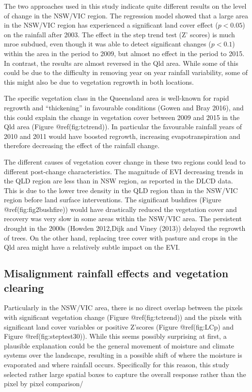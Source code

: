 \documentclass[fleqn,10pt,lineno]{wlpeerj} %
\begin{document}
The two approaches used in this study indicate quite different results
on the level of change in the NSW/VIC region. The regression model
showed that a large area in the NSW/VIC region has experienced a
significant land cover effect (\(p < 0.05\)) on the rainfall after 2003.
The effect in the step trend test (Z' scores) is much mroe subdued, even
though it was able to detect significant changes (\(p < 0.1\)) within
the area in the period to 2009, but almost no effect in the period to
2015. In contrast, the results are almost reversed in the Qld area.
While some of this could be due to the difficulty in removing year on
year rainfall variability, some of this might also be due to vegetation
regrowth in both locations.

The specific vegetation class in the Queensland area is well-known for
rapid regrowth and ``thickening'' in favourable conditions (Gowen and
Bray 2016), and this could explain the change in vegetation cover
between 2009 and 2015 in the Qld area (Figure @ref(fig:tctrend)). In
particular the favourable rainfall years of 2010 and 2011 would have
boosted regrowth, increasing evapotranspiration and therefore decreasing
the effect of the rainfall change.

The different causes of vegetation cover change in these two regions
could lead to different post-change characteristics. The magnitude of
EVI decreasing trends in the QLD region are less than in NSW region, as
reported in the DLCD data. This is due to the lower tree density in the
QLD region than in the NSW/VIC region before land surface interventions.
The significant bushfires (Figure @ref(fig:fig2bushfire)) would have
drastically reduced the vegetation cover and recovery was very slow in
some areas within the NSW/VIC area. The persistent drought in the 2000s
(Howden 2012,Dijk and Viney (2013)) delayed the regrowth of trees. On
the other hand, replacing tree cover with pasture and crops in the Qld
area might have a relatively subtle impact on the EVI.

\subsection{Misalignment rainfall effects and vegetation
clearing}\label{misalignment-rainfall-effects-and-vegetation-clearing}

Particularly in the NSW/VIC area, there is no direct overlap between the
pixels with significant vegetation change (Figure @ref(fig:tctrend)) and
the pixels with significant land cover variables or positive Z'scores
(Figure @ref(fig:LCp) and Figure @ref(fig:steptest30)). While this seems
possibly surprising at first, a plausible explanation could be the
general movement of moisture and climate systems over the landscape,
resulting in a possible shift of where the moisture is evaporated and
where rainfall occurs. Specifically for this reason, this study selected
rather large spatial boxes to capture the overall response rather than
the pixel by pixel comparison/
\end{document}
